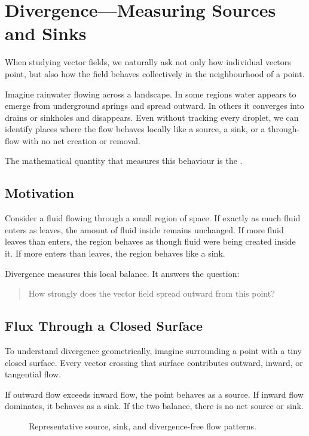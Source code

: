 \section{Divergence---Measuring Sources and Sinks}
\label{sec:divergence}

When studying vector fields, we naturally ask not only how individual vectors
point, but also how the field behaves collectively in the neighbourhood of a
point.

Imagine rainwater flowing across a landscape. In some regions water appears to
emerge from underground springs and spread outward. In others it converges into
drains or sinkholes and disappears. Even without tracking every droplet, we can
identify places where the flow behaves locally like a source, a sink, or a
through-flow with no net creation or removal.

The mathematical quantity that measures this behaviour is the
.

\subsection{Motivation}

Consider a fluid flowing through a small region of space. If exactly as much
fluid enters as leaves, the amount of fluid inside remains unchanged. If more
fluid leaves than enters, the region behaves as though fluid were being created
inside it. If more enters than leaves, the region behaves like a sink.

Divergence measures this local balance. It answers the question:

\begin{quote}
How strongly does the vector field spread outward from this point?
\end{quote}

\subsection{Flux Through a Closed Surface}

To understand divergence geometrically, imagine surrounding a point with a tiny
closed surface. Every vector crossing that surface contributes outward,
inward, or tangential flow.

If outward flow exceeds inward flow, the point behaves as a source. If inward
flow dominates, it behaves as a sink. If the two balance, there is no net source
or sink.

\begin{figure}[htbp]
\centering
\begingroup
{}

\endgroup
\caption{Representative source, sink, and divergence-free flow patterns.}
\label{fig:divergence-source-sink-neutral}
\end{figure}

